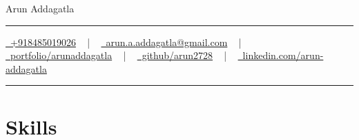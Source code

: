 \documentclass[letterpaper,10pt]{article}
\newcommand{\documentTitle}[2]{
  \begin{center}
    {\Huge\color{accentTitle} #1}
    \vspace{10pt}
    {\color{accentLine} \hrule}
    \vspace{2pt}
    \footnotesize{#2}
    \vspace{2pt}
    {\color{accentLine} \hrule}
  \end{center}
}
\newcommand{\tinysection}[1]{
  \phantomsection
  \addcontentsline{toc}{section}{#1}
  {\large{\bfseries\color{accentText}#1} {\color{accentLine} |}}
}
\begin{document}

\documentTitle{Arun Addagatla}{
    \href{tel:+918485019026}{
      \raisebox{-0.05\height} \faPhone\ +918485019026} ~ | ~
    \href{mailto:arun.a.addagatla@gmail.com}{
      \raisebox{-0.15\height} \faEnvelope\ arun.a.addagatla@gmail.com} ~ | ~
    \href{https://arunaddagatla.vercel.app/}{
      \raisebox{-0.15\height} \faGlobe\ portfolio/arunaddagatla} ~ | ~
    \href{https://github.com/arun2728}{
      \raisebox{-0.15\height} \faGithub\ github/arun2728} ~ | ~
      \href{https://linkedin.com/in/arun-addagatla/}{
      \raisebox{-0.15\height} \faLinkedin\ linkedin.com/arun-addagatla}
     
}






  \section{Skills}
\end{document}
